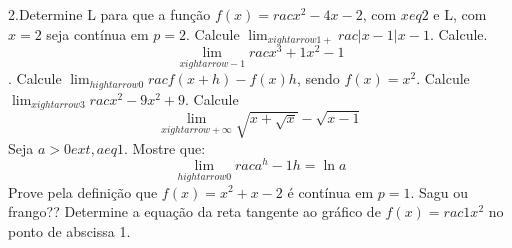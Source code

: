 \documentclass[a4paper, 11pt, addpoints]{exam}
\begin{document}

\info

\begin{multicols*}{2}
\begin{questions}
	\question
	2.Determine L para que a função $f(x)=rac{x^2 - 4}{x - 2}$, com $x 
eq 2$ e L, com $x = 2$ seja contínua em $p = 2$.
	\question
	Calcule $\lim_{x 
ightarrow 1+} rac{|x - 1|}{x - 1}$.
	\question
	Calcule. $$\lim_{x
ightarrow -1} rac{x^3 + 1}{x^2 - 1}$$.
	\question
	Calcule $\lim_{h 
ightarrow 0} rac{f(x+h) - f(x)}{h}$, sendo $f(x) = x^2$.
	\question
	Calcule  $\lim_{x
ightarrow 3} rac{x^2 - 9}{x^2 + 9}$.
	\question
	Calcule $$\lim_{x
ightarrow+\infty}\sqrt{x+\sqrt{x}} - \sqrt{x-1}$$
	\question
	Seja $a>0	ext{, }a
eq 1$. Mostre que: $$\lim_{h
ightarrow0}rac{a^h-1}{h}= \ln a$$ 
	\question
	Prove pela definição que $f(x) = x^2+ x - 2$ é contínua em $p = 1$.
	\question
	Sagu ou frango??
	\question
	Determine a equação da reta tangente ao gráfico de $f(x) = rac{1}{x^2}$ no ponto de abscissa 1.
\end{questions}
\end{multicols*}
\end{document}
